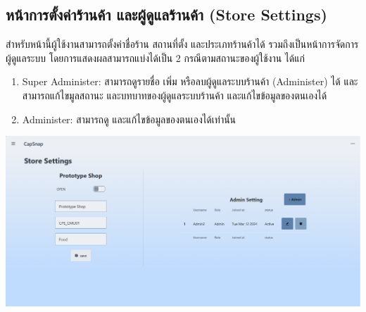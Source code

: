  \subsection{หน้าการตั้งค่าร้านค้า และผู้ดูแลร้านค้า (Store Settings)}
 สำหรับหน้านี้ผู้ใช้งานสามารถตั้งค่าชื่อร้าน สถานที่ตั้ง และประเภทร้านค้าได้ รวมถึงเป็นหน้าการจัดการผู้ดูแลระบบ โดยการแสดงผลสามารถแบ่งได้เป็น 2 กรณีตามสถานะของผู้ใช้งาน ได้แก่
 \begin{enumerate}
    \item Super Administer: สามารถดูรายชื่อ เพิ่ม หรือลบผู้ดูแลระบบร้านค้า (Administer) ได้ และสามารถแก้ไขมูลสถานะ และบทบาทของผู้ดูแลระบบร้านค้า และแก้ไขข้อมูลของตนเองได้
    \item Administer: สามารถดู และแก้ไขข้อมูลของตนเองได้เท่านั้น
\end{enumerate}
{
\includegraphics[scale=0.35]{pic/ui/w3.png}
}\\
